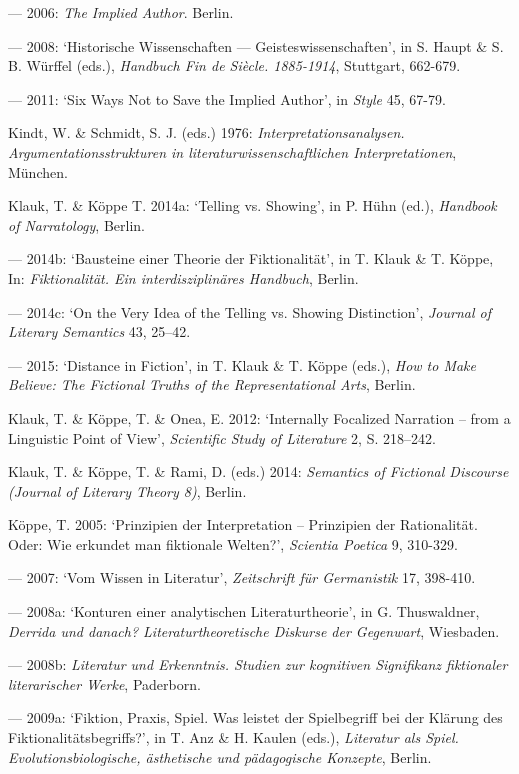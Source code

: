 \begin{hangparas}{.5cm}{1}
--- 2006: \emph{The Implied Author}. Berlin.

--- 2008: `Historische Wissenschaften --- Geisteswissenschaften', in S. Haupt \& S. B. W\"urffel (eds.), \emph{Handbuch Fin de Si\`ecle. 1885-1914}, Stuttgart, 662-679.

--- 2011: `Six Ways Not to Save the Implied Author', in \emph{Style} 45, 67-79.

Kindt, W. \& Schmidt, S. J. (eds.) 1976: \emph{Interpretationsanalysen. Argumentationsstrukturen in literaturwissenschaftlichen Interpretationen}, M\"unchen.

Klauk, T. \& K\"oppe T. 2014a: `Telling vs. Showing', in P. H\"uhn (ed.), \emph{Handbook of Narratology}, Berlin.

--- 2014b: `Bausteine einer Theorie der Fiktionalit\"at', in T. Klauk \& T. K\"oppe, In: \emph{Fiktionalit\"at. Ein interdisziplin\"ares Handbuch}, Berlin.

--- 2014c: `On the Very Idea of the Telling vs. Showing Distinction', \emph{Journal of Literary Semantics} 43, 25--42.

--- 2015: `Distance in Fiction', in T. Klauk \& T. K\"oppe (eds.), \emph{How to Make Believe: The Fictional Truths of the Representational Arts}, Berlin.

Klauk, T. \& K\"oppe, T. \& Onea, E. 2012: `Internally Focalized Narration -- from a Linguistic Point of View', \emph{Scientific Study of Literature} 2, S. 218--242.

Klauk, T. \& K\"oppe, T. \& Rami, D. (eds.) 2014: \emph{Semantics of Fictional Discourse (Journal of Literary Theory 8)}, Berlin.

K\"oppe, T. 2005: `Prinzipien der Interpretation -- Prinzipien der Rationalit\"at. Oder: Wie erkundet man fiktionale Welten?', \emph{Scientia Poetica} 9, 310-329.

--- 2007: `Vom Wissen in Literatur', \emph{Zeitschrift f\"ur Germanistik} 17, 398-410.

--- 2008a: `Konturen einer analytischen Literaturtheorie', in G. Thuswaldner, \emph{Derrida und danach? Literaturtheoretische Diskurse der Gegenwart}, Wiesbaden.

--- 2008b: \emph{Literatur und Erkenntnis. Studien zur kognitiven Signifikanz fiktionaler literarischer Werke}, Paderborn. 

--- 2009a: `Fiktion, Praxis, Spiel. Was leistet der Spielbegriff bei der Kl\"arung des Fiktionalit\"atsbegriffs?', in T. Anz \& H. Kaulen (eds.), \emph{Literatur als Spiel.  Evolutionsbiologische, \"asthetische und p\"adagogische Konzepte}, Berlin.


\end{hangparas}
